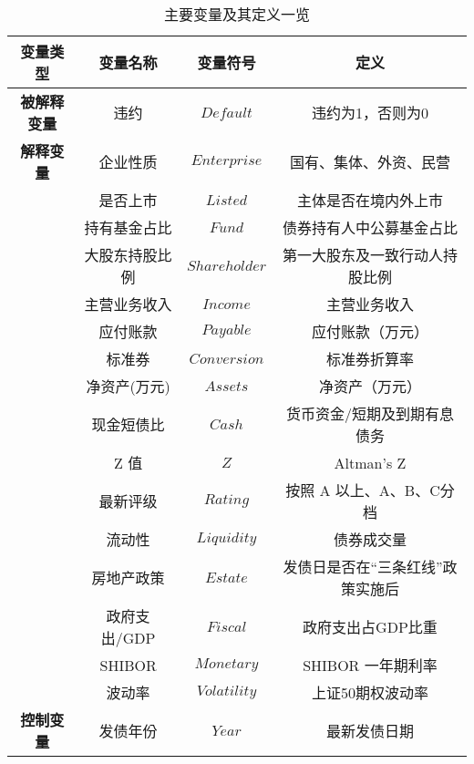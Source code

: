 \begin{table}[ht]
	\centering
	\caption{主要变量及其定义一览}
	\begin{tabular}{cccc}
      \toprule
		\textbf{变量类型}  & \textbf{变量名称} & \textbf{变量符号}   & \textbf{定义}       \\ \midrule
		\textbf{被解释变量} & 违约            & \(Default\)     & 违约为1，否则为0         \\\midrule
		\textbf{解释变量}  & 企业性质          & \(Enterprise\)  & 国有、集体、外资、民营       \\
		               & 是否上市          & \(Listed\)      & 主体是否在境内外上市        \\
		               & 持有基金占比        & \(Fund\)        & 债券持有人中公募基金占比      \\
		               & 大股东持股比例       & \(Shareholder\) & 第一大股东及一致行动人持股比例   \\
		               & 主营业务收入        & \(Income\)      & 主营业务收入            \\
		               & 应付账款          & \(Payable\)     & 应付账款（万元）          \\
		               & 标准券           & \(Conversion\)  & 标准券折算率            \\
		               & 净资产(万元)       & \(Assets\)      & 净资产（万元）           \\
		               & 现金短债比         & \(Cash\)        & 货币资金/短期及到期有息债务    \\
		               & Z 值           & \(Z\)           & Altman's Z        \\
		               & 最新评级          & \(Rating\)      & 按照 A 以上、A、B、C分档   \\
		               & 流动性           & \(Liquidity\)   & 债券成交量             \\
		               & 房地产政策         & \(Estate\)      & 发债日是否在“三条红线”政策实施后 \\
		               & 政府支出/GDP      & \(Fiscal\)      & 政府支出占GDP比重        \\
		               & SHIBOR        & \(Monetary\)    & SHIBOR 一年期利率      \\
		               & 波动率           & \(Volatility\)  & 上证50期权波动率         \\\midrule
		\textbf{控制变量}  & 发债年份          & \(Year\)        & 最新发债日期            \\
      \bottomrule
	\end{tabular}
	\label{tab:symbols}
\end{table}
